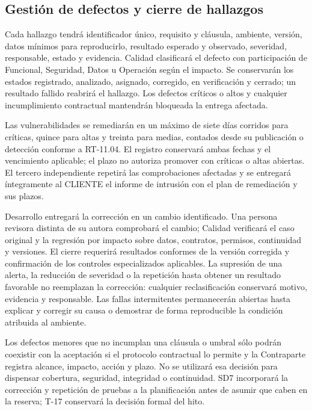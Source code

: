 \subsection{Gestión de defectos y cierre de hallazgos}
Cada hallazgo tendrá identificador único, requisito y cláusula, ambiente, versión, datos mínimos para reproducirlo, resultado esperado y observado, severidad, responsable, estado y evidencia. Calidad clasificará el defecto con participación de Funcional, Seguridad, Datos u Operación según el impacto. Se conservarán los estados registrado, analizado, asignado, corregido, en verificación y cerrado; un resultado fallido reabrirá el hallazgo. Los defectos críticos o altos y cualquier incumplimiento contractual mantendrán bloqueada la entrega afectada.

Las vulnerabilidades se remediarán en un máximo de siete días corridos para críticas, quince para altas y treinta para medias, contados desde su publicación o detección conforme a RT-11.04. El registro conservará ambas fechas y el vencimiento aplicable; el plazo no autoriza promover con críticas o altas abiertas. El tercero independiente repetirá las comprobaciones afectadas y se entregará íntegramente al CLIENTE el informe de intrusión con el plan de remediación y sus plazos. \parencite[RT-11.04/20, pp.~23--24]{sd9-bt}

Desarrollo entregará la corrección en un cambio identificado. Una persona revisora distinta de su autora comprobará el cambio; Calidad verificará el caso original y la regresión por impacto sobre datos, contratos, permisos, continuidad y versiones. El cierre requerirá resultados conformes de la versión corregida y confirmación de los controles especializados aplicables. La supresión de una alerta, la reducción de severidad o la repetición hasta obtener un resultado favorable no reemplazan la corrección: cualquier reclasificación conservará motivo, evidencia y responsable. Las fallas intermitentes permanecerán abiertas hasta explicar y corregir su causa o demostrar de forma reproducible la condición atribuida al ambiente.

Los defectos menores que no incumplan una cláusula o umbral sólo podrán coexistir con la aceptación si el protocolo contractual lo permite y la Contraparte registra alcance, impacto, acción y plazo. No se utilizará esa decisión para dispensar cobertura, seguridad, integridad o continuidad. SD7 incorporará la corrección y repetición de pruebas a la planificación antes de asumir que caben en la reserva; T-17 conservará la decisión formal del hito.

